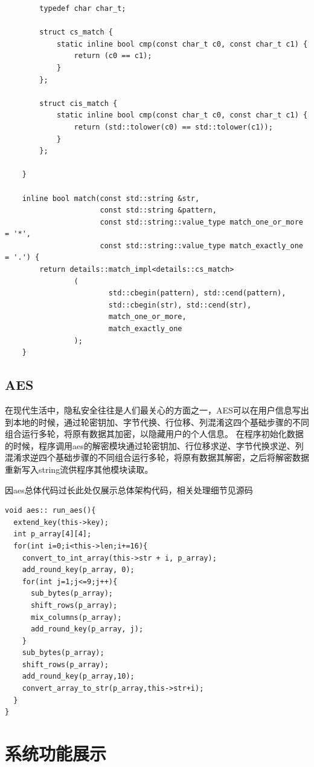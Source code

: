 \documentclass{ctexrep}
\begin{document}
\begin{verbatim}
        typedef char char_t;

        struct cs_match {
            static inline bool cmp(const char_t c0, const char_t c1) {
                return (c0 == c1);
            }
        };

        struct cis_match {
            static inline bool cmp(const char_t c0, const char_t c1) {
                return (std::tolower(c0) == std::tolower(c1));
            }
        };

    }

    inline bool match(const std::string &str,
                      const std::string &pattern,
                      const std::string::value_type match_one_or_more = '*',
                      const std::string::value_type match_exactly_one = '.') {
        return details::match_impl<details::cs_match>
                (
                        std::cbegin(pattern), std::cend(pattern),
                        std::cbegin(str), std::cend(str),
                        match_one_or_more,
                        match_exactly_one
                );
    }
\end{verbatim}

\section{AES}
在现代生活中，隐私安全往往是人们最关心的方面之一，AES可以在用户信息写出到本地的时候，通过轮密钥加、字节代换、行位移、列混淆这四个基础步骤的不同组合运行多轮，将原有数据其加密，以隐藏用户的个人信息。
在程序初始化数据的时候，程序调用aes的解密模块通过轮密钥加、行位移求逆、字节代换求逆、列混淆求逆四个基础步骤的不同组合运行多轮，将原有数据其解密，之后将解密数据重新写入string流供程序其他模块读取。

因aes总体代码过长此处仅展示总体架构代码，相关处理细节见源码
\begin{verbatim}
void aes:: run_aes(){
  extend_key(this->key);
  int p_array[4][4];
  for(int i=0;i<this->len;i+=16){
    convert_to_int_array(this->str + i, p_array);
    add_round_key(p_array, 0);
    for(int j=1;j<=9;j++){
      sub_bytes(p_array);
      shift_rows(p_array);
      mix_columns(p_array);
      add_round_key(p_array, j);
    }
    sub_bytes(p_array);
    shift_rows(p_array);
    add_round_key(p_array,10);
    convert_array_to_str(p_array,this->str+i);
  }
}
\end{verbatim}
\chapter{系统功能展示}
\end{document}
